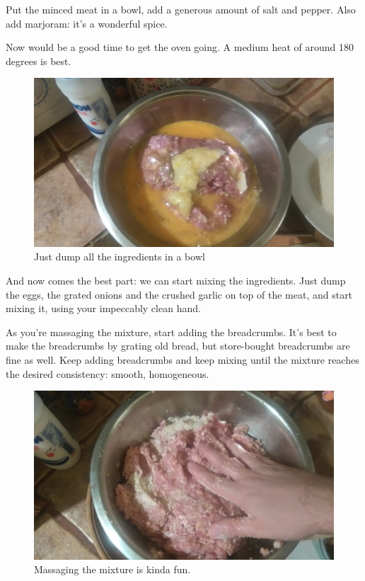 \documentclass{article}
\begin{document}
Put the minced meat in a bowl, add a generous amount of salt and pepper. Also add marjoram: it's a wonderful spice.

Now would be a good time to get the oven going. A medium heat of around 180 degrees is best.

\begin{figure}[!htbp]
\includegraphics[width=\textwidth]{meatloaf_09}
\caption{Just dump all the ingredients in a bowl}
\end{figure}

And now comes the best part: we can start mixing the ingredients. Just dump the eggs, the grated onions and the crushed garlic on top of the meat, and start mixing it, using your impeccably clean hand.

As you're massaging the mixture, start adding the breadcrumbs. It's best to make the breadcrumbs by grating old bread, but store-bought breadcrumbs are fine as well. Keep adding breadcrumbs and keep mixing until the mixture reaches the desired consistency: smooth, homogeneous.

\begin{figure}[!htbp]
\includegraphics[width=\textwidth]{meatloaf_11}
\caption{Massaging the mixture is kinda fun.}
\end{figure}
\end{document}
